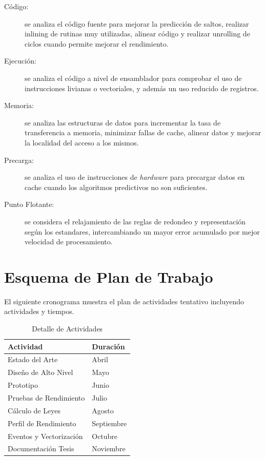\documentclass[a4paper]{article}
\begin{document}
\begin{description}
\item[Código:] se analiza el código fuente para mejorar la predicción de saltos, realizar inlining de rutinas muy utilizadas, alinear código y realizar unrolling de ciclos cuando permite mejorar el rendimiento.
\item[Ejecución:] se analiza el código a nivel de ensamblador para comprobar el uso de instrucciones livianas o vectoriales, y además un uso reducido de registros.
\item[Memoria:] se analiza las estructuras de datos para incrementar la tasa de transferencia a memoria, minimizar fallas de cache, alinear datos y mejorar la localidad del acceso a los mismos.
\item[Precarga:] se analiza el uso de instrucciones de {\it hardware} para precargar datos en cache cuando los algoritmos predictivos no son suficientes.
\item[Punto Flotante:] se considera el relajamiento de las reglas de redondeo y representación según los estandares, intercambiando un mayor error acumulado por mejor velocidad de procesamiento.
\end{description}

\section{Esquema de Plan de Trabajo}

El siguiente cronograma muestra el plan de actividades tentativo incluyendo actividades y tiempos.

\begin{table}[H]
  \caption{Detalle de Actividades}
  \centering
    \begin{tabular}{|l|l|}\hline
      {\bf Actividad} & {\bf Duración} \\ \hline
      Estado del Arte & Abril \\ \hline
      Diseño de Alto Nivel & Mayo \\ \hline
      Prototipo & Junio \\ \hline
      Pruebas de Rendimiento & Julio \\ \hline
      Cálculo de Leyes & Agosto \\ \hline
      Perfil de Rendimiento & Septiembre \\ \hline
      Eventos y Vectorización & Octubre \\ \hline
      Documentación Tesis & Noviembre \\ \hline
    \end{tabular}
  \label{schedule}
\end{table}
\end{document}
